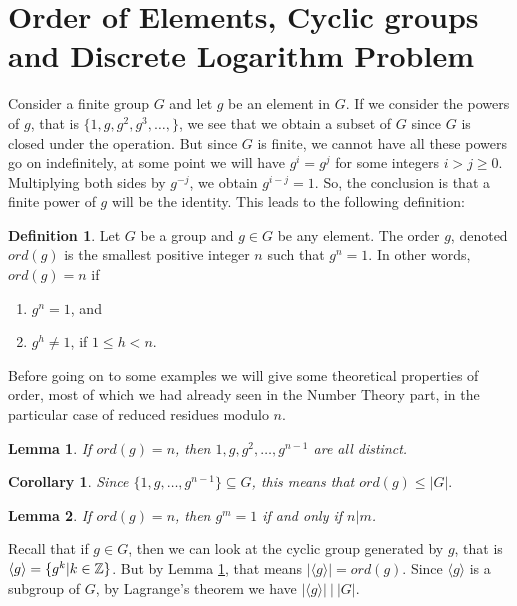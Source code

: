 \documentclass[12pt]{article}
\theoremstyle{plain}
\newtheorem{corollary}{Corollary}
\newtheorem{lemma}{Lemma}
\theoremstyle{definition}
\newtheorem{definition}{Definition}
\theoremstyle{remark}
\begin{document}
\section{Order of Elements, Cyclic groups and Discrete Logarithm Problem}
Consider a finite group $G$ and let $g$ be an element in $G$. If we consider the powers of $g$, that is
$\{1, g, g^2, g^3, \dots, \}$, we see that we obtain a subset of $G$ since $G$ is closed under the operation.
But since $G$ is finite, we cannot have all these powers go on indefinitely, at some point we will have $g^i=g^j$ for some integers $i>j\geq 0$. Multiplying both sides by $g^{-j}$, we obtain $g^{i-j}=1$. So, the conclusion is that a finite power of $g$ will be the identity. This leads to the following definition:
\begin{definition}
Let $G$ be a group and $g\in G$ be any element. The order $g$, denoted $ord(g)$ is the smallest positive integer $n$ such that $g^n=1$. In other words, $ord(g)=n$ if
\begin{enumerate}
    \item $g^n=1$, and
    \item $g^h\neq 1$, if $1\leq h <n$.
\end{enumerate}
\end{definition}
Before going on to some examples we will give some theoretical properties of order, most of which we had already seen in the Number Theory part, in the particular case of reduced residues modulo $n$.

\begin{lemma}\label{1}
If $ord(g) = n$, then $1, g, g^2, \dots, g^{n-1}$ are all distinct.
\end{lemma}

\begin{corollary}
Since $\{1,g, \dots, g^{n-1}\} \subseteq G$, this means that $ord(g)\leq |G|.$
\end{corollary}

\begin{lemma}
If $ord(g)=n$, then $g^m=1$ if and only if $n|m$.
\end{lemma}

Recall that if $g\in G$, then we can look at the cyclic group generated by $g$, that is $\langle g\rangle = \{g^k|k\in \mathbb{Z}\}$. But by Lemma \ref{1}, that means $|\langle g\rangle|  = ord(g)$. Since $\langle g \rangle$ is a subgroup of $G$, by Lagrange's theorem we have $|\langle g \rangle | \: | \: |G|$.
\end{document}
